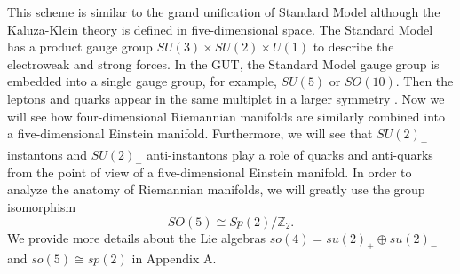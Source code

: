 \documentclass[12pt,epsf]{article}
\begin{document}
This scheme is similar to the grand unification of Standard Model although the Kaluza-Klein theory
is defined in five-dimensional space.
The Standard Model has a product gauge group $SU(3) \times SU(2) \times U(1)$ to describe the electroweak and strong forces.
In the GUT, the Standard Model gauge group is embedded into a single gauge group, for example,
$SU(5)$ or $SO(10)$. Then the leptons and quarks appear in the same multiplet in a larger symmetry \cite{georgi-book}.
Now we will see how four-dimensional Riemannian manifolds are similarly combined into a five-dimensional
Einstein manifold. Furthermore, we will see that $SU(2)_+$ instantons and $SU(2)_-$ anti-instantons play a role of
quarks and anti-quarks from the point of view of a five-dimensional Einstein manifold.
In order to analyze the anatomy of Riemannian manifolds, we will greatly use the group isomorphism \cite{penn4}
\begin{equation}\label{2-group-iso}
  SO(5) \cong Sp(2)/\mathbb{Z}_2.
\end{equation}
We provide more details about the Lie algebras $so(4)=su(2)_+ \oplus su(2)_-$ and $so(5)\cong sp(2)$ in Appendix A.
\end{document}
